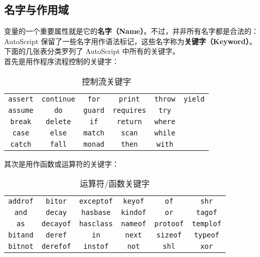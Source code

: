\subsection{名字与作用域}

变量的一个重要属性就是它的\textbf{名字（Name）}。不过，并非所有名字都是合法的：AutoScript 保留了一些名字用作语法标记，这些名字称为\textbf{关键字（Keyword）}。下面的几张表分类罗列了 AutoScript 中所有的关键字。 \\

首先是用作程序流程控制的关键字：

\begin{table}[H]
    \centering
    \begin{tabular}{|c|c|c|c|c|c|} \hline
        \lstinline!assert!  & \lstinline!continue!& \lstinline!for!		& \lstinline!print!		& \lstinline!throw!	& \lstinline!yield! \\
        \lstinline!assume!  & \lstinline!do!      & \lstinline!guard!   & \lstinline!requires!  & \lstinline!try! 	& \lstinline!!  \\
        \lstinline!break!   & \lstinline!delete!  & \lstinline!if!   	& \lstinline!return!  	& \lstinline!where! & \lstinline!! \\
        \lstinline!case!    & \lstinline!else!    & \lstinline!match!   & \lstinline!scan! 		& \lstinline!while! & \lstinline!! \\
        \lstinline!catch!   & \lstinline!fall!    & \lstinline!monad!	& \lstinline!then!   	& \lstinline!with! 	& \lstinline!! \\\hline
    \end{tabular}
    \caption{控制流关键字}
    \label{tab:control-keywords}
\end{table}

其次是用作函数或运算符的关键字：

\begin{table}[H]
    \centering
    \begin{tabular}{|c|c|c|c|c|c|} \hline
        \lstinline!addrof!  & \lstinline!bitor!     & \lstinline!exceptof!	& \lstinline!keyof! & \lstinline!of! 		& \lstinline!shr!     \\
        \lstinline!and!     & \lstinline!decay!     & \lstinline!hasbase!  	& \lstinline!kindof!& \lstinline!or! 		& \lstinline!tagof!      \\
        \lstinline!as!      & \lstinline!decayof!   & \lstinline!hasclass!  & \lstinline!nameof!& \lstinline!protoof! 	& \lstinline!templof!  \\
        \lstinline!bitand!  & \lstinline!deref!     & \lstinline!in!    	& \lstinline!next!  & \lstinline!sizeof! 	& \lstinline!typeof! \\
        \lstinline!bitnot!  & \lstinline!derefof!   & \lstinline!instof!    & \lstinline!not!   & \lstinline!shl! 		& \lstinline!xor! \\\hline
    \end{tabular}
    \caption{运算符/函数关键字}
    \label{tab:operator-keywords}
\end{table}

